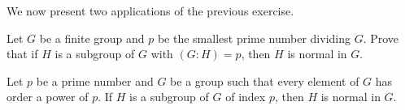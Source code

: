 We now present two applications of the previous exercise. 

\begin{exercise}
\label{xca:p_smallest}
    Let $G$ be a finite group and $p$ be the smallest prime number dividing $G$. Prove that if $H$ is a subgroup 
    of $G$ with $(G:H)=p$, then $H$ is normal in $G$. 
\end{exercise}

\begin{exercise}
Let $p$ be a prime number and $G$ be a group such that
every element of $G$ has order a power of $p$. 
If 
$H$ is a subgroup of $G$ of index $p$, then $H$ is normal in $G$.
\end{exercise}

